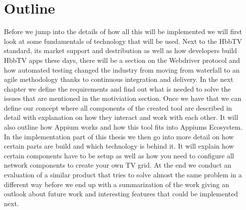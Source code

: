 \section{Outline\label{sec:outline}}

Before we jump into the details of how all this will be implemented we will first look at some fundamentals
of technology that will be used. Next to the HbbTV standard, its market support and destribution as well
as how developers build HbbTV apps these days, there will be a section on the Webdriver protocol and how
automated testing changed the industry from moving from waterfall to an agile methodology thanks to
continuous integration and delivery. In the next chapter we define the requirements and find out what is
needed to solve the issues that are mentioned in the motiviation section. Once we have that we can define
our concept where all components of the created tool are described in detail with explanation on how they
interact and work with each other. It will also outline how Appium works and how this tool fits into
Appiums Ecosystem. In the implementation part of this thesis we then go into more detail on how certain
parts are build and which technology is behind it. It will explain how certain components have to be
setup as well as how you need to configure all network components to create your own TV grid. At the
end we conduct an evaluation of a similar product that tries to solve almost the same problem in a
different way before we end up with a summarization of the work giving an outlook about future work and
interesting features that could be implemented next.

